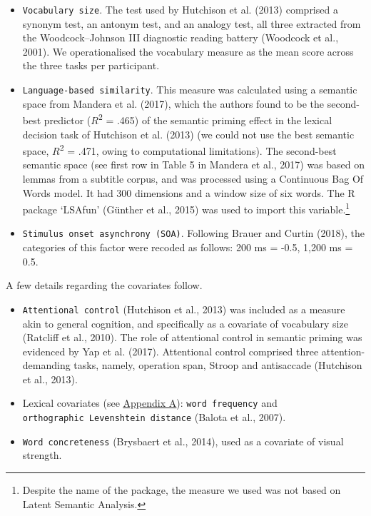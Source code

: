 \documentclass[
  12pt,
  man,floatsintext]{apa7}
\begin{document}
\begin{itemize}
\item
  \texttt{Vocabulary\ size}. The test used by Hutchison et al. (2013) comprised a synonym test, an antonym test, and an analogy test, all three extracted from the Woodcock--Johnson III diagnostic reading battery (Woodcock et al., 2001). We operationalised the vocabulary measure as the mean score across the three tasks per participant.
\item
  \texttt{Language-based\ similarity}. This measure was calculated using a semantic space from Mandera et al. (2017), which the authors found to be the second-best predictor (\(R\)\textsuperscript{2} = .465) of the semantic priming effect in the lexical decision task of Hutchison et al. (2013) (we could not use the best semantic space, \(R\)\textsuperscript{2} = .471, owing to computational limitations). The second-best semantic space (see first row in Table 5 in Mandera et al., 2017) was based on lemmas from a subtitle corpus, and was processed using a Continuous Bag Of Words model. It had 300 dimensions and a window size of six words. The R package `LSAfun' (Günther et al., 2015) was used to import this variable.\footnote{Despite the name of the package, the measure we used was not based on Latent Semantic Analysis.}
\item
  \texttt{Stimulus\ onset\ asynchrony\ (SOA)}. Following Brauer and Curtin (2018), the categories of this factor were recoded as follows: 200 ms = -0.5, 1,200 ms = 0.5.
\end{itemize}

A few details regarding the covariates follow.

\begin{itemize}
\item
  \texttt{Attentional\ control} (Hutchison et al., 2013) was included as a measure akin to general cognition, and specifically as a covariate of vocabulary size (Ratcliff et al., 2010). The role of attentional control in semantic priming was evidenced by Yap et al. (2017). Attentional control comprised three attention-demanding tasks, namely, operation span, Stroop and antisaccade (Hutchison et al., 2013).
\item
  Lexical covariates (see \protect\hyperlink{appendix-A-lexical-covariates}{\underline{Appendix A}}): \texttt{word\ frequency} and \texttt{orthographic\ Levenshtein\ distance} (Balota et al., 2007).
\item
  \texttt{Word\ concreteness} (Brysbaert et al., 2014), used as a covariate of visual strength.
\end{itemize}
\end{document}
